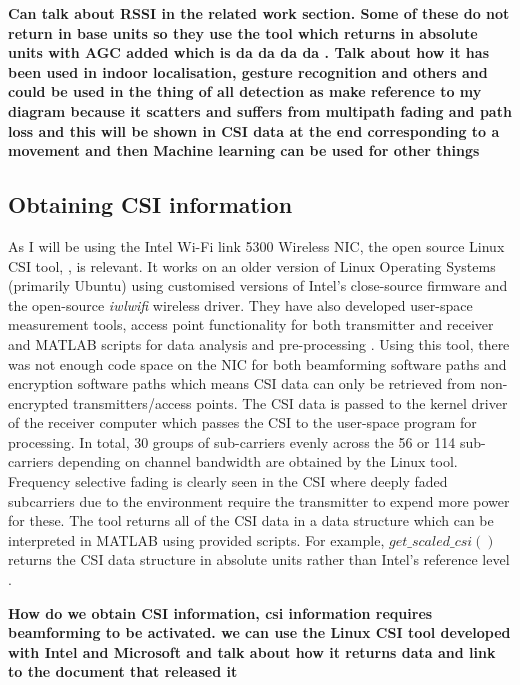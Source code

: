\textbf{Can talk about RSSI in the related work section. Some of these do not return in base units so they use the tool which returns in absolute units with AGC added which is da da da da . Talk about how it has been used in indoor localisation, gesture recognition and others and could be used in the thing of all detection as make reference to my diagram because it scatters and suffers from multipath fading and path loss and this will be shown in CSI data at the end corresponding to a movement and then Machine learning can be used for other things}
\subsection{Obtaining CSI information}
As I will be using the Intel Wi-Fi link 5300 Wireless NIC, the open source Linux CSI tool, \cite{Halperin_csitool}, is relevant. It works on an older version of Linux Operating Systems (primarily Ubuntu) using customised versions of Intel's close-source firmware and the open-source \textit{iwlwifi} wireless driver. They have also developed user-space measurement tools, access point functionality for both transmitter and receiver and MATLAB scripts for data analysis and pre-processing \citep{Halperin_csitool}. Using this tool, there was not enough code space on the NIC for both beamforming software paths and encryption software paths which means CSI data can only be retrieved from non-encrypted transmitters/access points. The CSI data is passed to the kernel driver of the receiver computer which passes the CSI to the user-space program for processing. In total, 30 groups of sub-carriers evenly across the 56 or 114 sub-carriers depending on channel bandwidth are obtained by the Linux tool. Frequency selective fading is clearly seen in the CSI where deeply faded subcarriers due to the environment require the transmitter to expend more power for these. The tool returns all of the CSI data in a data structure which can be interpreted in MATLAB using provided scripts. For example, $get\_scaled\_csi()$ returns the CSI data structure in absolute units rather than Intel's reference level \citep{Halperin_csitool}.



\textbf{How do we obtain CSI information, csi information requires beamforming to be activated. we can use the Linux CSI tool developed with Intel and Microsoft and talk about how it returns data and link to the document that released it} \\\\





